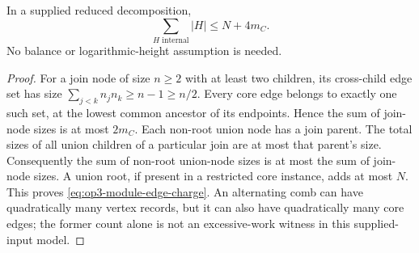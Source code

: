 \begin{lemma}
\label{lem:op3-module-edge-charge}
In a supplied reduced decomposition,
\begin{equation}
 \sum_{H\text{ internal}}|H|\leq N+4m_C.
 \label{eq:op3-module-edge-charge}
\end{equation}
No balance or logarithmic-height assumption is needed.
\end{lemma}
\begin{proof}
For a join node of size $n\geq2$ with at least two children, its cross-child
edge set has size $\sum_{j<k}n_jn_k\geq n-1\geq n/2$.
Every core edge belongs to exactly one such set, at the lowest common
ancestor of its endpoints. Hence the sum of join-node sizes is at most
$2m_C$. Each non-root union node has a join parent. The total sizes of all
union children of a particular join are at most that parent's size.
Consequently the sum of non-root union-node sizes is at most the sum of
join-node sizes. A union root, if present in a restricted core instance,
adds at most $N$. This proves \cref{eq:op3-module-edge-charge}.
An alternating comb can have quadratically many vertex records, but it
can also have quadratically many core edges; the former count alone is not
an excessive-work witness in this supplied-input model.
\end{proof}

